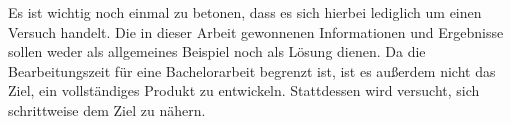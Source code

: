 \myNewSection
Es ist wichtig noch einmal zu betonen, dass es sich hierbei lediglich um einen Versuch handelt. Die in dieser Arbeit gewonnenen Informationen und Ergebnisse sollen weder als allgemeines Beispiel noch als Lösung dienen.\newline%
Da die Bearbeitungszeit für eine Bachelorarbeit begrenzt ist, ist es außerdem nicht das Ziel, ein vollständiges Produkt zu entwickeln. Stattdessen wird versucht, sich schrittweise dem Ziel zu nähern.%
%
%
%	
%
